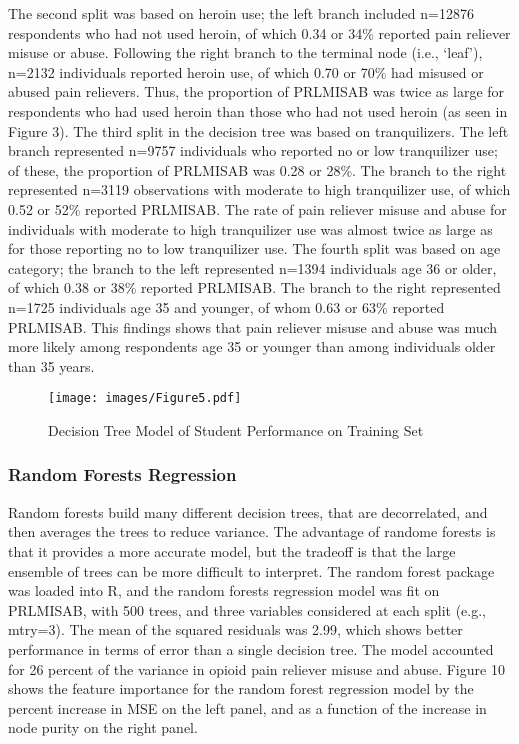 \documentclass[sigconf]{acmart}
\begin{document}
The second split was based on heroin use; the left branch included n=12876 
respondents who had not used heroin, of which 0.34 or 34\% reported pain
reliever misuse or abuse. Following the right branch to the terminal node 
(i.e., `leaf'), n=2132 individuals reported heroin use, of which 0.70 or 
70\% had misused or abused pain relievers. Thus, the proportion of PRLMISAB 
was twice as large for respondents who had used heroin than those who had 
not used heroin (as seen in Figure 3). The third split in the decision tree
was based on tranquilizers. The left branch represented n=9757 individuals 
who reported no or low tranquilizer use; of these, the proportion of 
PRLMISAB was 0.28 or 28\%. The branch to the right represented n=3119 
observations with moderate to high tranquilizer use, of which 0.52 or 52\% 
reported PRLMISAB. The rate of pain reliever misuse and abuse for individuals 
with moderate to high tranquilizer use was almost twice as large as for 
those reporting no to low tranquilizer use. The fourth split was based on age 
category; the branch to the left represented n=1394 individuals age 36 or older, 
of which 0.38 or 38\% reported PRLMISAB. The branch to the right represented 
n=1725 individuals age 35 and younger, of whom 0.63 or 63\% reported PRLMISAB. 
This findings shows that pain reliever misuse and abuse was much more likely
among respondents age 35 or younger than among individuals older than 35 years. 

\begin{figure}[!ht]
  \centering\texttt{[image: images/Figure5.pdf]}
  \caption{Decision Tree Model of Student Performance on Training Set}
  \label{f:Figure5}
\end{figure}


\subsubsection{Random Forests Regression}

Random forests build many different decision trees, that are decorrelated, and 
then averages the trees to reduce variance. The advantage of randome forests is 
that it provides a more accurate model, but the tradeoff is that the large 
ensemble of trees can be more difficult to interpret. The random forest package 
was loaded into R, and the random forests regression model was fit on PRLMISAB, 
with 500 trees, and three variables considered at each split (e.g., mtry=3).
The mean of the squared residuals was 2.99, which shows better performance
in terms of error than a single decision tree. The model accounted for 26
percent of the variance in opioid pain reliever misuse and abuse. Figure 10
shows the feature importance for the random forest regression model by the
percent increase in MSE on the left panel, and as a function of the increase
in node purity on the right panel. 
\end{document}
